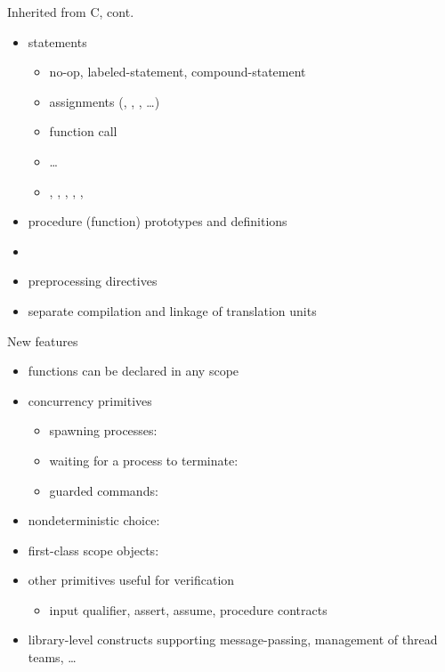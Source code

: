 \documentclass[t]{beamer}
\begin{document}
\begin{frame}{Inherited from C, cont.}
  \begin{itemize}
  \item statements
    \begin{itemize}
    \item no-op, labeled-statement, compound-statement
    \item assignments (\code{=}, \code{+=}, \code{-=}, \ldots)
    \item function call
    \item {}\ldots{}
    \item {}, , , ,
      , 
    \end{itemize}
  \item procedure (function) prototypes and definitions
  \item {}
  \item preprocessing directives
  \item separate compilation and linkage of translation units
  \end{itemize}
\end{frame}

\begin{frame}{New features}
  \begin{itemize}
  \item functions can be declared in any scope
  \item concurrency primitives
    \begin{itemize}
    \item spawning processes: 
    \item waiting for a process to terminate: 
    \item guarded commands: 
    \end{itemize}
  \item nondeterministic choice: 
  \item first-class scope objects: 
  \item other primitives useful for verification
    \begin{itemize}
    \item input qualifier, assert, assume, procedure contracts
    \end{itemize}
  \item library-level constructs supporting message-passing,
    management of thread teams, \ldots
  \end{itemize}
\end{frame}
\end{document}
